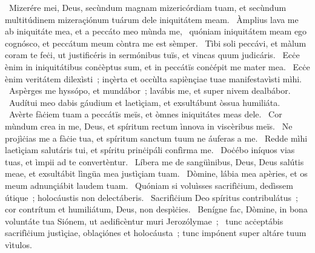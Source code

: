\psalmChapterWithInscription{}
{ }
{%
~Mizerére mei, Deus, secùndum magnam mizericórdiam tuam, et secùndum multitúdinem mizeraçiónum tuárum dele iniquitátem meam. 
~Àmplius lava me ab iniquitáte mea, et a peccáto meo mùnda me, 
~quóniam iniquitátem meam ego cognósco, et peccátum meum còntra me est sèmper. 
~Tìbi soli peccávi, et màlum coram te feċi, ut justificéris in sermónibus tuïs, et vincas quum judicáris. 
~Ecċe ènim in iniquitátibus conċèptus sum, et in peccátïs conċépit me mater mea. 
~Ecċe ènim veritátem dilexìsti~; inçèrta et occùlta sapiènçiae tuae manifestavìsti mìhi. 
~Aspèrges me hyssópo, et mundábor~; lavábis me, et super nivem dealbábor. 
~Audítui meo dabis gáudium et laetìçiam, et exsultábunt òssua humiliáta. 
~Avèrte fàċiem tuam a peccátïs meïs, et òmnes iniquitátes meas dele. 
~Cor mùndum crea in me, Deus, et spíritum rectum ìnnova in viscèribus meïs. 
~Ne projìċias me a fàċie tua, et spíritum sanctum tuum ne áuferas a me. 
~Redde mìhi laetìçiam salutáris tui, et spíritu prinċipáli confìrma me. 
~Doċébo iníquos vias tuas, et ìmpii ad te convertèntur. 
~Líbera me de sangüìnibus, Deus, Deus salútis meae, et exsultábit lìngüa mea justìçiam tuam. 
~Dòmine, lábia mea apèries, et os meum adnunçiábit laudem tuam. 
~Quóniam si voluìsses sacrifìċium, dedìssem útique~; holocáustis non delectáberis. 
~Sacrifìċium Deo spíritus contribulátus~; cor contrítum et humiliátum, Deus, non despìċies. 
~Benígne fac, Dòmine, in bona voluntáte tua Siónem, ut aedificèntur muri Jerozólymae~; 
~tunc acċeptábis sacrifìċium justìçiae, oblaçiónes et holocáusta~; tunc impónent super altáre tuum vìtulos. 
}
